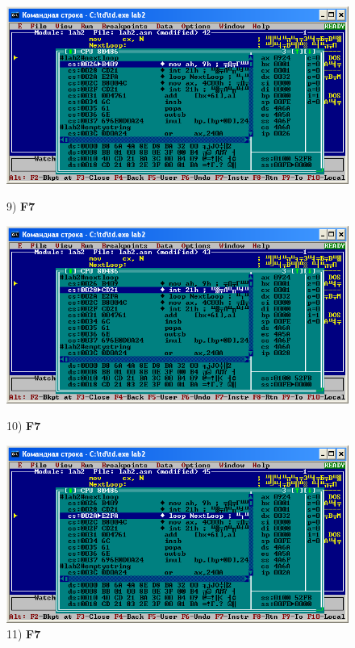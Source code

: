 \begin{figure}[!htp]
    \centering
    \begin{minipage}{0.32\textwidth}
        \centering
        \includegraphics[width=.99\linewidth]
            {../_INCLUDES/task-4-9/9.png}
        \caption{9) \textbf{F7}}
        \label{fig:task_4_9}
    \end{minipage}
    \begin {minipage}{0.32\textwidth}
        \centering
        \includegraphics[width=.99\linewidth]
            {../_INCLUDES/task-4-9/10.png}
        \caption{10) \textbf{F7}}
        \label{fig:task_4_9}
    \end{minipage}
    \begin {minipage}{0.32\textwidth}
        \centering
        \includegraphics[width=.99\linewidth]
            {../_INCLUDES/task-4-9/11.png}
        \caption{11) \textbf{F7}}
        \label{fig:task_4_9}
    \end{minipage}
\end{figure}

